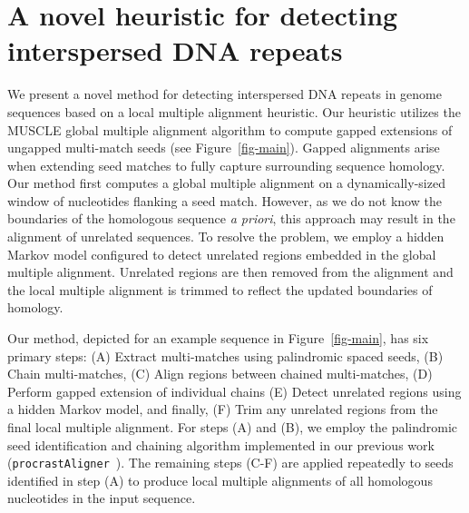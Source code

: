 \documentclass[12pt,journal,letterpaper,onecolumn, draftcls]{IEEEtran}
\begin{document}
\section{A novel heuristic for detecting interspersed DNA repeats}
\label{section-main}
We present a novel method for detecting interspersed DNA repeats in genome sequences based on a local multiple alignment heuristic. Our heuristic utilizes the MUSCLE
global multiple alignment algorithm to compute gapped extensions of ungapped
multi-match seeds (see Figure~\ref{fig-main}). Gapped alignments arise
when extending seed matches to fully capture surrounding sequence
homology. Our method first computes a
global multiple alignment on a dynamically-sized window of nucleotides
flanking a seed match.  However, as we do not know the boundaries of the
homologous sequence \textit{a priori}, this approach may result in the
alignment of unrelated sequences.  To resolve the problem, we employ a hidden Markov model configured to detect
unrelated regions embedded in the global multiple alignment.
Unrelated regions are then removed from the alignment and the
local multiple alignment is trimmed to reflect the updated boundaries
of homology.

Our method, depicted for an example sequence in
Figure~\ref{fig-main}, has six primary steps: (A) Extract multi-matches using
palindromic spaced seeds, (B) Chain
multi-matches, (C) Align regions between chained multi-matches, (D)
Perform gapped extension of individual chains (E) Detect unrelated regions
using a hidden Markov model, and finally, (F) Trim any unrelated regions from
the final local multiple alignment. For steps (A) and (B), we employ the palindromic seed identification
and chaining algorithm implemented in our previous work (\texttt{procrastAligner}~\cite{ref-procrast}). The remaining steps (C-F) are applied
repeatedly to seeds identified in step (A) to produce local multiple
alignments of all homologous nucleotides in the input sequence.
\end{document}
